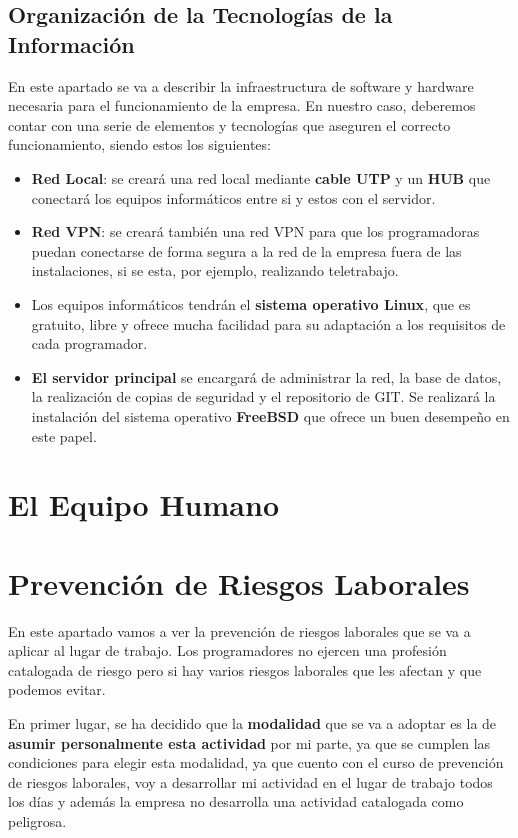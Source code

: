 \subsection{Organización de la Tecnologías de la Información}
En este apartado se va a describir la infraestructura de software y hardware necesaria para el funcionamiento de la empresa. En nuestro caso, deberemos contar con una serie de elementos y tecnologías que aseguren el correcto funcionamiento, siendo estos los siguientes:

\begin{itemize}
    \item \textbf{Red Local}: se creará una red local mediante \textbf{cable UTP} y un \textbf{HUB} que conectará los equipos informáticos entre si y estos con el servidor.

    \item \textbf{Red VPN}: se creará también una red VPN para que los programadoras puedan conectarse de forma segura a la red de la empresa fuera de las instalaciones, si se esta, por ejemplo, realizando teletrabajo.

    \item Los equipos informáticos tendrán el \textbf{sistema operativo Linux}, que es gratuito, libre y ofrece mucha facilidad para su adaptación a los requisitos de cada programador.

    \item \textbf{El servidor principal} se encargará de administrar la red, la base de datos, la realización de copias de seguridad y el repositorio de GIT. Se realizará la instalación del sistema operativo \textbf{FreeBSD} que ofrece un buen desempeño en este papel.
\end{itemize}


\section{El Equipo Humano}

\section{Prevención de Riesgos Laborales}
En este apartado vamos a ver la prevención de riesgos laborales que se va a aplicar al lugar de trabajo. Los programadores no ejercen una profesión catalogada de riesgo pero si hay varios riesgos laborales que les afectan y que podemos evitar.

En primer lugar, se ha decidido que la \textbf{modalidad} que se va a adoptar es la de \textbf{asumir personalmente esta actividad} por mi parte, ya que se cumplen las condiciones para elegir esta modalidad, ya que cuento con el curso de prevención de riesgos laborales, voy a desarrollar mi actividad en el lugar de trabajo todos los días y además la empresa no desarrolla una actividad catalogada como peligrosa.

